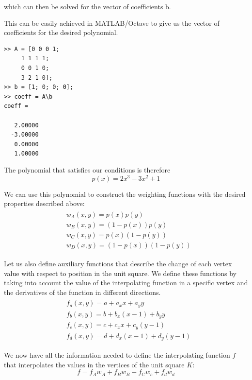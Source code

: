 \documentclass[fleqn]{article}
\begin{document}
which can then be solved for the vector of coefficients b.

\newpage

This can be easily achieved in MATLAB/Octave to give us the vector of coefficients for the desired polynomial.

\begin{tcolorbox}
	\begin{verbatim}
>> A = [0 0 0 1;
     1 1 1 1; 
     0 0 1 0; 
     3 2 1 0];        
>> b = [1; 0; 0; 0];
>> coeff = A\b
coeff =

   2.00000
  -3.00000
   0.00000
   1.00000
	\end{verbatim}
\end{tcolorbox}

The polynomial that satisfies our conditions is therefore 
\begin{equation}
p(x) = 2x^3 - 3x^2 + 1
\end{equation}

We can use this polynomial to construct the weighting functions with the desired properties described above:
\begin{align}
\begin{split}
& w_{A}(x, y) = p(x)p(y) \\
& w_{B}(x, y) = (1 - p(x))p(y) \\
& w_{C}(x, y) = p(x)(1 - p(y)) \\
& w_{D}(x, y) = (1 - p(x))(1 - p(y))
\end{split}
\end{align}

Let us also define auxiliary functions that describe the change of each vertex value with respect to position in the unit square. We define these functions by taking into account the value of the interpolating function in a specific vertex and the derivatives of the function in different directions.
\begin{align}
\begin{split}
& f_{a}(x, y) = a + a_{x}x + a_{y}y \\
& f_{b}(x, y) = b + b_{x}(x - 1) + b_{y}y \\
& f_{c}(x, y) = c + c_{x}x + c_{y}(y - 1) \\
& f_{d}(x, y) = d + d_{x}(x - 1) + d_{y}(y - 1)
\end{split}
\end{align}

We now have all the information needed to define the interpolating function $f$ that interpolates the values in the vertices of the unit square $K$:
\begin{equation}
f = f_{A}w_{A} + f_{B}w_{B} + f_{C}w_{c} + f_{d}w_{d}
\end{equation}
\end{document}

